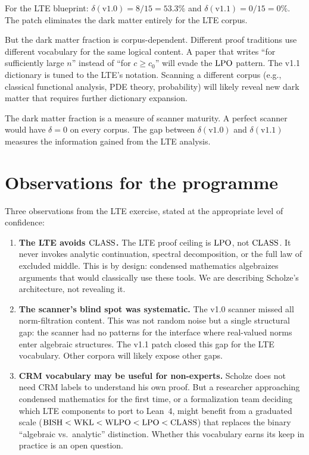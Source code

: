 \documentclass[11pt,a4paper]{article}
\theoremstyle{plain}
\theoremstyle{definition}
\newcommand{\BISH}{\textup{BISH}}
\newcommand{\WKL}{\textup{WKL}}
\newcommand{\WLPO}{\textup{WLPO}}
\newcommand{\LPO}{\textup{LPO}}
\newcommand{\CLASS}{\textup{CLASS}}
\begin{document}
For the LTE blueprint: $\delta(\text{v1.0}) = 8/15 = 53.3\%$ and
$\delta(\text{v1.1}) = 0/15 = 0\%$.  The patch eliminates the dark
matter entirely for the LTE corpus.

But the dark matter fraction is corpus-dependent.  Different proof
traditions use different vocabulary for the same logical content.
A paper that writes ``for sufficiently large $n$'' instead of
``for $c \geq c_0$'' will evade the $\LPO$ pattern.  The v1.1
dictionary is tuned to the LTE's notation.  Scanning a different
corpus (e.g., classical functional analysis, PDE theory, probability)
will likely reveal new dark matter that requires further dictionary
expansion.

The dark matter fraction is a measure of scanner maturity.  A perfect
scanner would have $\delta = 0$ on every corpus.  The gap between
$\delta(\text{v1.0})$ and $\delta(\text{v1.1})$ measures the
information gained from the LTE analysis.

\section{Observations for the programme}\label{sec:implications}

Three observations from the LTE exercise, stated at the appropriate
level of confidence:

\begin{enumerate}[label=(\arabic*)]
\item \textbf{The LTE avoids $\CLASS$.}
  The LTE proof ceiling is $\LPO$, not $\CLASS$.  It never invokes
  analytic continuation, spectral decomposition, or the full law
  of excluded middle.  This is by design: condensed mathematics
  algebraizes arguments that would classically use these tools.
  We are describing Scholze's architecture, not revealing it.

\item \textbf{The scanner's blind spot was systematic.}
  The v1.0 scanner missed all norm-filtration content.  This was
  not random noise but a single structural gap: the scanner had no
  patterns for the interface where real-valued norms enter algebraic
  structures.  The v1.1 patch closed this gap for the LTE vocabulary.
  Other corpora will likely expose other gaps.

\item \textbf{CRM vocabulary may be useful for non-experts.}
  Scholze does not need CRM labels to understand his own proof.  But
  a researcher approaching condensed mathematics for the first time,
  or a formalization team deciding which LTE components to port to
  Lean~4, might benefit from a graduated scale ($\BISH < \WKL <
  \WLPO < \LPO < \CLASS$) that replaces the binary
  ``algebraic vs.\ analytic'' distinction.  Whether this vocabulary
  earns its keep in practice is an open question.
\end{enumerate}
\end{document}
